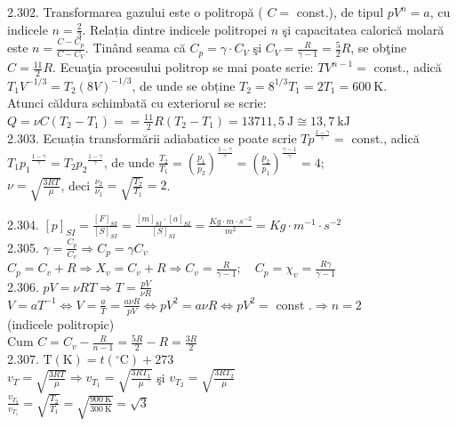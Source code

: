 2.302. Transformarea gazului este o politropă ( $C=$ const.), de tipul $p V^{n}=a$, cu indicele $n=\frac{2}{3}$. Relația dintre indicele politropei $n$ şi capacitatea calorică molară este $n=\frac{C-C_{p}}{C-C_{V}}$. Tinând seama că $C_{p}=\gamma \cdot C_{V}$ şi $C_{V}=\frac{R}{\gamma-1}=\frac{5}{2} R$, se obţine $C=\frac{11}{2} R$. Ecuaţia procesului politrop se mai poate scrie: $T V^{n-1}=$ const., adică $T_{1} V^{-1 / 3}=T_{2}(8 V)^{-1 / 3}$, de unde se obține $T_{2}=8^{1 / 3} T_{1}=2 T_{1}=600 \mathrm{~K}$.\\ Atunci căldura schimbată cu exteriorul se scrie:\\ $Q=\nu C\left(T_{2}-T_{1}\right)==\frac{11}{2} R\left(T_{2}-T_{1}\right)=13711,5 \mathrm{~J} \cong 13,7 \mathrm{~kJ}$\\

2.303. Ecuația transformării adiabatice se poate scrie $T p^{\frac{1-\gamma}{\gamma}}=$ const., adică $T_{1} p_{1}{ }^{\frac{1-\gamma}{\gamma}}=T_{2} p_{2}{ }^{\frac{1-\gamma}{\gamma}}$, de unde $\frac{T_{2}}{T_{1}}=\left(\frac{p_{1}}{p_{2}}\right)^{\frac{1-\gamma}{\gamma}}=\left(\frac{p_{2}}{p_{1}}\right)^{\frac{\gamma-1}{\gamma}}=4$;\\ $\nu=\sqrt{\frac{3 R T}{\mu}}$, deci $\frac{\nu_{2}}{\nu_{1}}=\sqrt{\frac{T_{2}}{T_{1}}}=2$.

2.304. $[p]_{S I}=\frac{[F]_{S I}}{[S]_{S I}}=\frac{[m]_{S I} \cdot[a]_{S I}}{[S]_{S I}}=\frac{K g \cdot m \cdot s^{-2}}{m^{2}}=K g \cdot m^{-1} \cdot s^{-2}$\\

2.305. $\gamma=\frac{C_{p}}{C_{v}} \Rightarrow C_{p}=\gamma C_{v}$\\ $C_{p}=C_{v}+R \Rightarrow X_{v}=C_{v}+R \Rightarrow C_{v}=\frac{R}{\gamma-1} ; \quad C_{p}=\chi_{v}=\frac{R \gamma}{\gamma-1}$\\

2.306. $p V=\nu R T \Rightarrow T=\frac{p V}{\nu R}$\\ $V=a T^{-1} \Leftrightarrow V=\frac{a}{T}=\frac{a \nu R}{p V} \Leftrightarrow p V^{2}=a \nu R \Leftrightarrow p V^{2}=$ const $. \Rightarrow n=2$\\ (indicele politropic)\\ Cum $C=C_{v}-\frac{R}{n-1}=\frac{5 R}{2}-R=\frac{3 R}{2}$\\

2.307. $\mathrm{T}(\mathrm{K})=t\left({ }^{\circ} \mathrm{C}\right)+273$\\ $v_{T}=\sqrt{\frac{3 R T}{\mu}} \Rightarrow v_{T_{1}}=\sqrt{\frac{3 R T_{1}}{\mu}}$ şi $v_{T_{2}}=\sqrt{\frac{3 R T_{2}}{\mu}}$\\ $\frac{v_{T_{2}}}{v_{T_{1}}}=\sqrt{\frac{T_{2}}{T_{1}}}=\sqrt{\frac{900 \mathrm{~K}}{300 \mathrm{~K}}}=\sqrt{3}$\\

